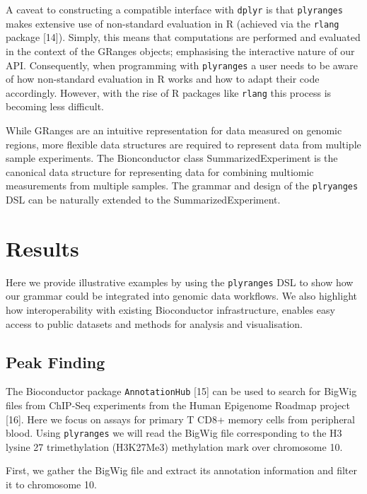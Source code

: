 \documentclass[10pt,letterpaper]{article}
\begin{document}
A caveat to constructing a compatible interface with \texttt{dplyr} is
that \texttt{plyranges} makes extensive use of non-standard evaluation
in R (achieved via the \texttt{rlang} package {[}14{]}). Simply, this
means that computations are performed and evaluated in the context of
the GRanges objects; emphasising the interactive nature of our API.
Consequently, when programming with \texttt{plyranges} a user needs to
be aware of how non-standard evaluation in R works and how to adapt
their code accordingly. However, with the rise of R packages like
\texttt{rlang} this process is becoming less difficult.

While GRanges are an intuitive representation for data measured on
genomic regions, more flexible data structures are required to represent
data from multiple sample experiments. The Bionconductor class
SummarizedExperiment is the canonical data structure for representing
data for combining multiomic measurements from multiple samples. The
grammar and design of the \texttt{plryanges} DSL can be naturally
extended to the SummarizedExperiment.

\hypertarget{results}{%
\section{Results}\label{results}}

Here we provide illustrative examples by using the \texttt{plyranges}
DSL to show how our grammar could be integrated into genomic data
workflows. We also highlight how interoperability with existing
Bioconductor infrastructure, enables easy access to public datasets and
methods for analysis and visualisation.

\hypertarget{peak-finding}{%
\subsection{Peak Finding}\label{peak-finding}}

The Bioconductor package \texttt{AnnotationHub} {[}15{]} can be used to
search for BigWig files from ChIP-Seq experiments from the Human
Epigenome Roadmap project {[}16{]}. Here we focus on assays for primary
T CD8+ memory cells from peripheral blood. Using \texttt{plyranges} we
will read the BigWig file corresponding to the H3 lysine 27
trimethylation (H3K27Me3) methylation mark over chromosome 10.

First, we gather the BigWig file and extract its annotation information
and filter it to chromosome 10.
\end{document}
